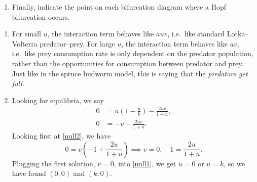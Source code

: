 \documentclass[a4paper,12pt]{article}
\begin{document}
\begin{enumerate}
{\begin{enumerate}[label=(\alph*)]
        \item Finally, indicate the point on each bifurcation diagram where a Hopf bifurcation occurs.
      \end{enumerate}
    }
    { %
      \begin{enumerate}
        \item %
          For small $u$, the interaction term behaves like $auv$, i.e.\ like standard Lotka--Volterra predator--prey. For large $u$, the interaction term behaves like $av$, i.e.\ like prey consumption rate is only dependent on the predator population, rather than the opportunities for consumption between predator and prey. Just like in the spruce budworm model, this is saying that the \emph{predators get full}.

        \item %
          Looking for equilibria, we say
          \begin{subequations}
            \begin{align}
              0 &= u\left(1-\frac{u}{k}\right)-\frac{2uv}{1+u}, \label{null1}\\
              0 &= -v + \frac{2uv}{1+u}. \label{null2}
            \end{align}
          \end{subequations}
          Looking first at \cref{null2}, we have
          \begin{equation}
            0 = v\left(-1+\frac{2u}{1+u}\right) \implies v=0, \quad 1=\frac{2u}{1+u}.
          \end{equation}
          Plugging the first solution, $v=0$, into \cref{null1}, we get $u=0$ or $u=k$, so we have found $(0,0)$ and $(k,0)$.


\end{enumerate}}
\end{enumerate}
\end{document}
